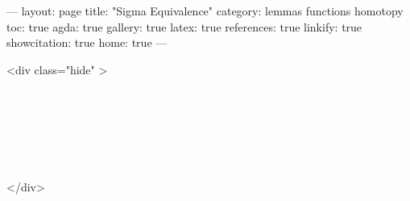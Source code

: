 ---
layout: page
title: "Sigma Equivalence"
category: lemmas functions homotopy
toc: true
agda: true
gallery: true
latex: true
references: true
linkify: true
showcitation: true
home: true
---

<div class="hide" >
\begin{code}%
\>[0]\AgdaSymbol{\{-\#}\AgdaSpace{}%
\AgdaSpace{}%
\AgdaSpace{}%
\AgdaSymbol{\#-\}}\<%
\\
\>[0]\AgdaSpace{}%
\AgdaSpace{}%
\<%
\\
\>[0]\AgdaSpace{}%
\AgdaSpace{}%
\<%
\\
%
\\[\AgdaEmptyExtraSkip]%
\>[0]\AgdaSpace{}%
\AgdaSpace{}%
\<%
\\
\>[0]\AgdaSpace{}%
\AgdaSpace{}%
\<%
\end{code}
</div>


\begin{code}%
\>[0]\AgdaSpace{}%
\AgdaSpace{}%
\AgdaSymbol{\{}\AgdaSpace{}%
\AgdaSymbol{\}}\AgdaSpace{}%
\AgdaSymbol{\{}\AgdaSpace{}%
\AgdaSymbol{:}\AgdaSpace{}%
\AgdaSpace{}%
\AgdaSymbol{\}}\AgdaSpace{}%
\AgdaSymbol{\{}\AgdaSpace{}%
\AgdaSymbol{:}\AgdaSpace{}%
\AgdaSpace{}%
\AgdaSpace{}%
\AgdaSpace{}%
\AgdaSymbol{\}}\AgdaSpace{}%
\<%
\end{code}

